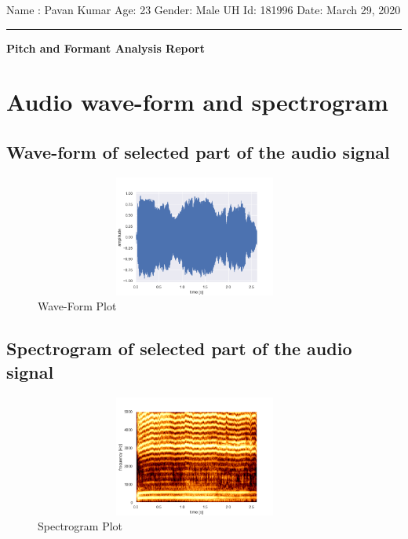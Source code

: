\documentclass{article}%
\begin{document}
%
\normalsize%
\begin{minipage}{\textwidth}%
\flushleft%
Name : Pavan Kumar%
\newline%
Age: 23%
\newline%
Gender: Male%
\newline%
UH Id: 181996%
\newline%
Date: March 29, 2020%
\linebreak%
\noindent\rule{\textwidth}{1pt}%
\newline%
\linebreak%
\begin{minipage}{\textwidth}%
\centering%
\begin{Large}%
\textbf{Pitch and Formant Analysis Report}%
\end{Large}%
\end{minipage}%
\end{minipage}%
\section{Audio wave{-}form and spectrogram}%
\label{sec:Audiowave{-}formandspectrogram}%
\subsection{Wave{-}form of selected part of the audio signal}%
\label{subsec:Wave{-}formofselectedpartoftheaudiosignal}%
\begin{figure}[h!]%
\centering%
\includegraphics[width=400px, height=150px]{sound.png}%
\caption{Wave-Form Plot}%
\end{figure}

%
\subsection{Spectrogram of selected part of the audio signal}%
\label{subsec:Spectrogramofselectedpartoftheaudiosignal}%
\begin{figure}[h!]%
\centering%
\includegraphics[width=400px, height=150px]{spectrogram.png}%
\caption{Spectrogram Plot}%
\end{figure}
\end{document}
